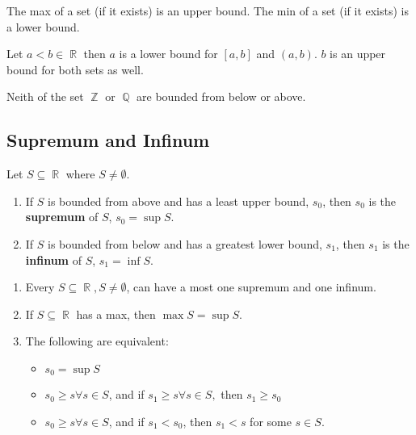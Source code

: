 \documentclass[a4paper, 11pt]{article}
\DeclareMathOperator{\R}{\mathbb{R}}
\DeclareMathOperator{\Q}{\mathbb{Q}}
\DeclareMathOperator*{\Z}{\mathbb{Z}}
\begin{document}
\begin{example}
The max of a set (if it exists) is an upper bound. The min of a set (if it exists) is a lower bound.
\end{example}

\begin{example}
Let $a < b \in \R$ then $a$ is a lower bound for $[a, b]$ and $(a, b)$. $b$ is an upper bound for
both sets as well.
\end{example}

\begin{example}
Neith of the set $\Z$ or $\Q$ are bounded from below or above.
\end{example}

\subsection{Supremum and Infinum}
\begin{definition}
Let $S \subseteq \R$ where $S \neq \emptyset$.
\begin{enumerate}
  \item If $S$ is bounded from above and has a least upper bound, $s_0$, then $s_0$ is the
  \textbf{supremum} of $S$, $s_0=\sup S$.
  \item If $S$ is bounded from below and has a greatest lower bound, $s_1$, then $s_1$ is the
  \textbf{infinum} of $S$, $s_1=\inf S$.
\end{enumerate}

\begin{remark}
  \begin{enumerate}
    \item Every $S \subseteq \R, S\neq \emptyset$, can have a most one supremum and one infinum.
    \item If $S \subseteq \R$ has a max, then $\max S = \sup S$.
    \item The following are equivalent:
    \begin{itemize}
      \item $s_0 = \sup S$
      \item $s_0 \geq s \forall s \in S$, and if $s_1 \geq s \forall s \in S,$ then $s_1 \geq s_0$
      \item $s_0 \geq s \forall s \in S$, and if $s_1 < s_0$, then $s_1 < s$ for some $s \in S$.
    \end{itemize}
  \end{enumerate}
\end{remark}
\end{definition}
\end{document}
